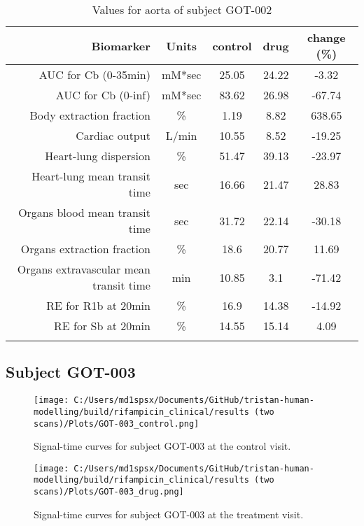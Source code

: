 \documentclass{epflreport}%
\begin{document}
\begin{longtable}{rcccc}%
\hline%
Biomarker&Units&control&drug&change (\%)\\%
\hline%
AUC for Cb (0{-}35min)&mM*sec&25.05&24.22&{-}3.32\\%
AUC for Cb (0{-}inf)&mM*sec&83.62&26.98&{-}67.74\\%
Body extraction fraction&\%&1.19&8.82&638.65\\%
Cardiac output&L/min&10.55&8.52&{-}19.25\\%
Heart{-}lung dispersion&\%&51.47&39.13&{-}23.97\\%
Heart{-}lung mean transit time&sec&16.66&21.47&28.83\\%
Organs blood mean transit time&sec&31.72&22.14&{-}30.18\\%
Organs extraction fraction&\%&18.6&20.77&11.69\\%
Organs extravascular mean transit time&min&10.85&3.1&{-}71.42\\%
RE for R1b at 20min&\%&16.9&14.38&{-}14.92\\%
RE for Sb at 20min&\%&14.55&15.14&4.09\\%
\hline%
\caption{Values for aorta of subject GOT-002} \\%
\end{longtable}%
\clearpage%
\subsection{Subject GOT{-}003}%
\label{subsec:SubjectGOT{-}003}%

%


\begin{figure}[h!]%
\centering%
\texttt{[image: C:/Users/md1spsx/Documents/GitHub/tristan-human-modelling/build/rifampicin\_clinical/results (two scans)/Plots/GOT-003\_control.png]}%
\caption{Signal{-}time curves for subject GOT{-}003 at the control visit.}%
\end{figure}

%


\begin{figure}[h!]%
\centering%
\texttt{[image: C:/Users/md1spsx/Documents/GitHub/tristan-human-modelling/build/rifampicin\_clinical/results (two scans)/Plots/GOT-003\_drug.png]}%
\caption{Signal{-}time curves for subject GOT{-}003 at the treatment visit.}%
\end{figure}
\end{document}
